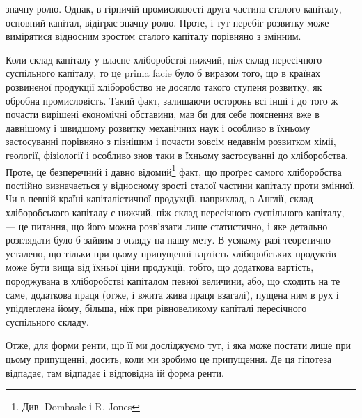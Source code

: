 \parcont{}  %
значну ролю. Однак, в гірничій промисловості друга частина сталого капіталу, основний капітал,
відіграє значну ролю. Проте, і тут перебіг розвитку може вимірятися відносним зростом сталого
капіталу порівняно з змінним.

Коли склад капіталу у власне хліборобстві нижчий, ніж склад пересічного
суспільного капіталу, то це prima facie було б виразом того, що в країнах
розвиненої продукції хліборобство не досягло такого ступеня розвитку, як обробна промисловість.
Такий факт, залишаючи осторонь всі інші і до того ж почасти вирішені економічні обставини, мав би
для себе пояснення вже в давнішому і швидшому розвитку механічних наук і особливо в їхньому
застосуванні порівняно з пізнішим і почасти зовсім недавнім розвитком хімії, геології, фізіології і
особливо знов таки в їхньому застосуванні до хліборобства. Проте, це безперечний і давно відомий\footnote{Див. Dombasle і R. Jones}
факт, що проґрес самого хліборобства постійно визначається у відносному зрості сталої частини
капіталу проти змінної. Чи в певній країні капіталістичної продукції, наприклад, в Англії, склад
хліборобського капіталу є нижчий, ніж склад пересічного суспільного капіталу, — це питання, що його
можна розв’язати лише статистично, і яке детально розглядати було б зайвим з огляду на нашу мету. В
усякому разі теоретично усталено, що тільки при цьому припущенні вартість хліборобських продуктів
може бути вища від їхньої ціни продукції; тобто, що додаткова вартість, породжувана в хліборобстві
капіталом певної величини, або, що сходить на те саме, додаткова праця (отже, і вжита жива праця
взагалі), пущена ним в рух і упідлеглена йому, більша, ніж при рівновеликому капіталі пересічного
суспільного складу.

Отже, для форми ренти, що її ми досліджуємо тут, і яка може постати лише
при цьому припущенні, досить, коли ми зробимо це припущення. Де ця гіпотеза
відпадає, там відпадає і відповідна їй форма ренти.

